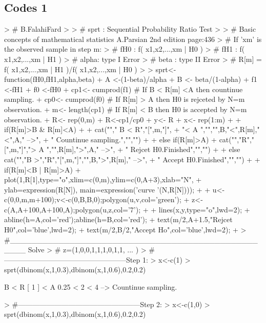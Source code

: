 \documentclass{article}
\begin{document}
\subsection{Codes 1}
\begin{Schunk}
\begin{Sinput}
> # B.FalahiFard 
>  
> #                     sprt : Sequential Probability Ratio Test
>  
> # Basic concepts of mathematical statistics A.Parsian 2nd edition page:436
> # If 'xm' is the observed sample in step m:
> # fH0  : f( x1,x2,...,xm | H0 )
> # fH1  : f( x1,x2,...,xm | H1 )
> # alpha: type I Error
> # beta : type II Error
> # R[m] = f( x1,x2,...,xm | H1 )/f( x1,x2,...,xm | H0 )
>  
> sprt<-function(fH0,fH1,alpha,beta){ 
+ A  <-(1-beta)/alpha      
+ B  <- beta/(1-alpha)   
+ f1 <-fH1               
+ f0 <-fH0
+ cp1<- cumprod(f1)     # If B < R[m] <A then countinue sampling. 
+ cp0<- cumprod(f0)     # If R[m] > A then H0 is rejceted by N=m observation.
+ m<- length(cp1)       # If R[m] < B then H0 is accepted by N=m observation.
+ R<- rep(0,m)
+ R<-cp1/cp0
+ y<- R
+ x<- rep(1:m)
+  
+ if(R[m]>B & R[m]<A){
+  
+ cat("\n","    B <  R","[",m,"]",
+ "< A    ","\n","",B,"<",R[m],"<",A,"   -->",
+ " Countinue sampling.","\n","\n")}
+  
+ else if(R[m]>A)
+ cat("\n","R","[",m,"]","> A    ","\n",R[m],">",A,"      -->",
+ " Rejcet H0.Finished","\n","\n")
+   
+ else cat("\n","B >","R","[",m,"]","\n",B,">",R[m],"       -->",
+ " Accept H0.Finished","\n","\n")
+  
+ if(R[m]<B | R[m]>A) {
+ plot(1,R[1],type="o",xlim=c(0,m),ylim=c(0,A+3),xlab="N",
+ ylab=expression(R[N]), main=expression('curve '(N,R[N])));
+  
+ u<-c(0,0,m,m+100);v<-c(0,B,B,0);polygon(u,v,col='green');
+ z<-c(A,A+100,A+100,A);polygon(u,z,col='7');
+  
+ lines(x,y,type="o",lwd=2);
+ abline(h=A,col='red');abline(h=B,col='red');
+ text(m/2,A+1.5,"Rejcet H0",col='blue',lwd=2);
+ text(m/2,B/2,"Accept Ho",col='blue',lwd=2);
+ }}
> #__________________________________________________ Solve 
> # z=(1,0,0,1,1,1,0,1,1, ... )
> #---------------------------------------------------Step 1:
> x<-c(1)
> sprt(dbinom(x,1,0.3),dbinom(x,1,0.6),0.2,0.2)
\end{Sinput}
\begin{Soutput}
     B <  R [ 1 ] < A     
  0.25 < 2 < 4    -->  Countinue sampling. 
\end{Soutput}
\begin{Sinput}
> #---------------------------------------------------Step 2:
> x<-c(1,0)
> sprt(dbinom(x,1,0.3),dbinom(x,1,0.6),0.2,0.2)
\end{Sinput}
\begin{Soutput}

\end{Soutput}
\end{Schunk}
\end{document}
